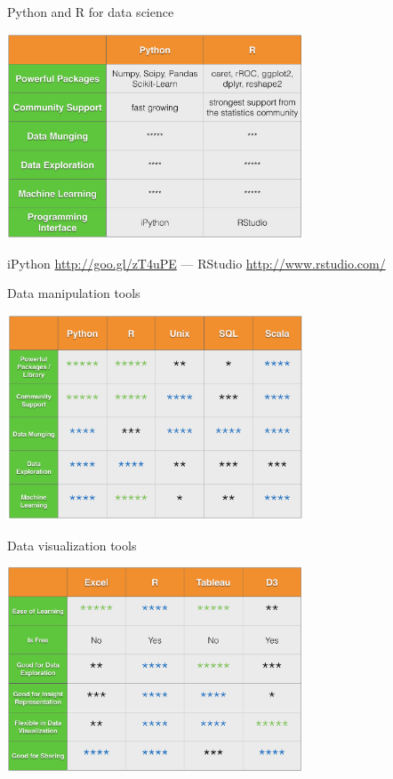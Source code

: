 \documentclass[10pt]{beamer}
\begin{document}
    \begin{frame}{Python and R for data science}
      \begin{center}
        \includegraphics[width=250pt]{../graphs/python_r}
      \end{center}
      {\footnotesize
        iPython \url{http://goo.gl/zT4uPE}
        --- 
        RStudio \url{http://www.rstudio.com/}
      }
    \end{frame}

    \begin{frame}{Data manipulation tools}
      \begin{center}
         \includegraphics[width=250pt]{../graphs/data_tools}
      \end{center}
    \end{frame}

    \begin{frame}{Data visualization tools}
      \begin{center}
         \includegraphics[width=250pt]{../graphs/data_visualization_tools}
      \end{center}
    \end{frame}
  
\end{document}
